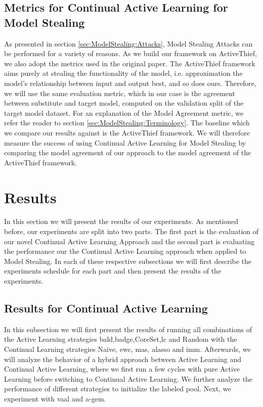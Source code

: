 \subsection{Metrics for Continual Active Learning for Model Stealing}
\label{sec:Evaluation:Metrics:CALMS}
As presented in section \ref{sec:ModelStealing:Attacks}, Model Stealing Attacks can be performed for a variety of reasons. As we build our framework on ActiveThief, we also
adopt the metrics used in the original paper. The ActiveThief framework aims purely at stealing the functionality of the model, i.e. approximation the model's relationship
between input and output best, and so does ours. Therefore, we will use the same evaluation metric, which in our case is the agreement between substitute and target model,
computed on the validation split of the target model dataset. For an explanation of the Model Agreement metric, we refer the reader to section \ref{sec:ModelStealing:Terminology}.
The baseline which we compare our results against is the ActiveThief framework. We will therefore measure the success of using Continual Active Learning for Model Stealing by comparing
the model agreement of our approach to the model agreement of the ActiveThief framework.

\section{Results}
\label{sec:Evaluation:Results}
In this section we will present the results of our experiments. As mentioned before, our experiments are split into two parts. The first part is the evaluation of our novel
Continual Active Learning Approach and the second part is evaluating the performance our the Continual Active Learning approach when applied to Model Stealing. In each of these
respective subsections we will first describe the experiments schedule for each part and then present the results of the experiments.

\subsection{Results for Continual Active Learning}
\label{sec:Evaluation:Results:CAL}
In this subsection we will first present the results of running all combinations of the Active Learning strategies \gls{bald},\gls{badge},CoreSet,\gls{lc} and Random with the Continual Learning strategies
Naive, \gls{ewc}, \gls{mas}, \gls{alasso} and \gls{imm}. Afterwards, we will analyze the behavior of a hybrid approach between Active Learning and Continual Active Learning, where we first run a few cycles with
pure Active Learning before switching to Continual Active Learning. We further analyze the performance of different strategies to initialize the labeled pool. Next, we experiment with \gls{vaal}
and \gls{a-gem}.

